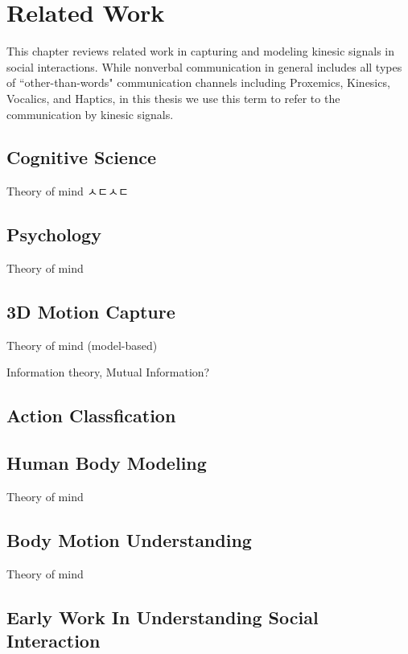 
\chapter{Related Work}

This chapter reviews related work in capturing and modeling kinesic signals in social interactions. While nonverbal communication in general includes all types of ``other-than-words" communication channels including Proxemics, Kinesics, Vocalics, and Haptics, in this thesis we use this term to refer to the communication by kinesic signals. 




\section{Cognitive Science}
Theory of mind
ㅅㄷㅅㄷ

\section{Psychology}
Theory of mind


\section{3D Motion Capture}
Theory of mind (model-based)


Information theory, Mutual Information?

\section{Action Classfication}


\section{Human Body Modeling}
Theory of mind



\section{Body Motion Understanding}
Theory of mind


\section{Early Work In Understanding Social Interaction}

